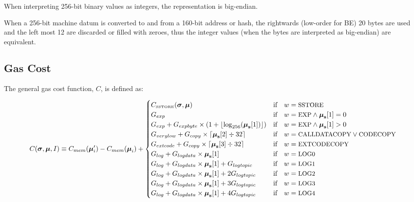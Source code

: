 \documentclass[9pt,oneside]{amsart}
\begin{document}
When interpreting 256-bit binary values as integers, the representation is big-endian.

When a 256-bit machine datum is converted to and from a 160-bit address or hash, the rightwards (low-order for BE) 20 bytes are used and the left most 12 are discarded or filled with zeroes, thus the integer values (when the bytes are interpreted as big-endian) are equivalent.

\subsection{Gas Cost}

The general gas cost function, $C$, is defined as:

\begin{equation}
C(\boldsymbol{\sigma}, \boldsymbol{\mu}, I) \equiv C_{mem}(\boldsymbol{\mu}'_i)-C_{mem}(\boldsymbol{\mu}_i) + \begin{cases}
C_\text{\tiny SSTORE}(\boldsymbol{\sigma}, \boldsymbol{\mu}) & \text{if} \quad w = \text{\small SSTORE} \\
G_{exp} & \text{if} \quad w = \text{\small EXP} \wedge \boldsymbol{\mu}_\mathbf{s}[1] = 0 \\
G_{exp} + G_{expbyte}\times(1+\lfloor\log_{256}(\boldsymbol{\mu}_\mathbf{s}[1])\rfloor) & \text{if} \quad w = \text{\small EXP} \wedge \boldsymbol{\mu}_\mathbf{s}[1] > 0 \\
G_{verylow} + G_{copy}\times\lceil\boldsymbol{\mu}_\mathbf{s}[2] \div 32\rceil & \text{if} \quad w = \text{\small CALLDATACOPY} \lor \text{\small CODECOPY} \\
G_{extcode} + G_{copy}\times\lceil\boldsymbol{\mu}_\mathbf{s}[3] \div 32\rceil & \text{if} \quad w = \text{\small EXTCODECOPY} \\
G_{log}+G_{logdata}\times\boldsymbol{\mu}_\mathbf{s}[1] & \text{if} \quad w = \text{\small LOG0} \\
G_{log}+G_{logdata}\times\boldsymbol{\mu}_\mathbf{s}[1]+G_{logtopic} & \text{if} \quad w = \text{\small LOG1} \\
G_{log}+G_{logdata}\times\boldsymbol{\mu}_\mathbf{s}[1]+2G_{logtopic} & \text{if} \quad w = \text{\small LOG2} \\
G_{log}+G_{logdata}\times\boldsymbol{\mu}_\mathbf{s}[1]+3G_{logtopic} & \text{if} \quad w = \text{\small LOG3} \\
G_{log}+G_{logdata}\times\boldsymbol{\mu}_\mathbf{s}[1]+4G_{logtopic} & \text{if} \quad w = \text{\small LOG4} \\

\end{cases}
\end{equation}
\end{document}
